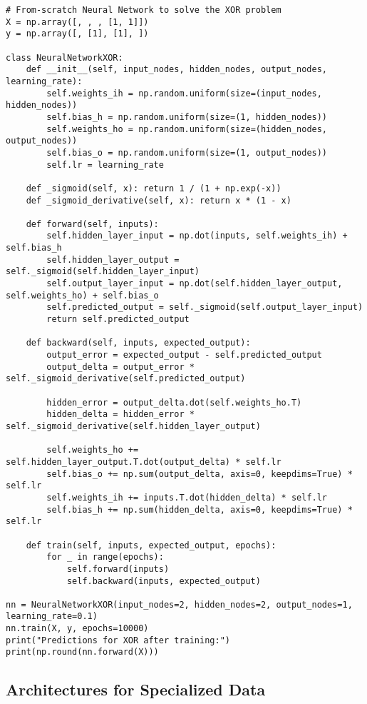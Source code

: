 \documentclass[11pt,a4paper]{article}
\begin{document}
\begin{lstlisting}
# From-scratch Neural Network to solve the XOR problem
X = np.array([, , , [1, 1]])
y = np.array([, [1], [1], ])

class NeuralNetworkXOR:
    def __init__(self, input_nodes, hidden_nodes, output_nodes, learning_rate):
        self.weights_ih = np.random.uniform(size=(input_nodes, hidden_nodes))
        self.bias_h = np.random.uniform(size=(1, hidden_nodes))
        self.weights_ho = np.random.uniform(size=(hidden_nodes, output_nodes))
        self.bias_o = np.random.uniform(size=(1, output_nodes))
        self.lr = learning_rate

    def _sigmoid(self, x): return 1 / (1 + np.exp(-x))
    def _sigmoid_derivative(self, x): return x * (1 - x)

    def forward(self, inputs):
        self.hidden_layer_input = np.dot(inputs, self.weights_ih) + self.bias_h
        self.hidden_layer_output = self._sigmoid(self.hidden_layer_input)
        self.output_layer_input = np.dot(self.hidden_layer_output, self.weights_ho) + self.bias_o
        self.predicted_output = self._sigmoid(self.output_layer_input)
        return self.predicted_output

    def backward(self, inputs, expected_output):
        output_error = expected_output - self.predicted_output
        output_delta = output_error * self._sigmoid_derivative(self.predicted_output)

        hidden_error = output_delta.dot(self.weights_ho.T)
        hidden_delta = hidden_error * self._sigmoid_derivative(self.hidden_layer_output)

        self.weights_ho += self.hidden_layer_output.T.dot(output_delta) * self.lr
        self.bias_o += np.sum(output_delta, axis=0, keepdims=True) * self.lr
        self.weights_ih += inputs.T.dot(hidden_delta) * self.lr
        self.bias_h += np.sum(hidden_delta, axis=0, keepdims=True) * self.lr

    def train(self, inputs, expected_output, epochs):
        for _ in range(epochs):
            self.forward(inputs)
            self.backward(inputs, expected_output)

nn = NeuralNetworkXOR(input_nodes=2, hidden_nodes=2, output_nodes=1, learning_rate=0.1)
nn.train(X, y, epochs=10000)
print("Predictions for XOR after training:")
print(np.round(nn.forward(X)))
\end{lstlisting}

\subsection{Architectures for Specialized Data}
\end{document}
